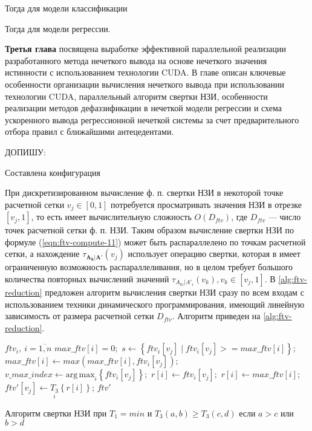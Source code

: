 Тогда для модели классификации

Тогда для модели регрессии.

\textbf{Третья глава} посвящена выработке эффективной параллельной реализации разработанного метода нечеткого вывода на основе нечеткого значения истинности с использованием технологии CUDA. В главе описан ключевые особенности организации вычисления нечеткого вывода при использовании технологии CUDA, параллельный алгоритм свертки НЗИ, особенности реализации методов дефаззификации в нечеткой модели регрессии и схема ускоренного вывода регрессионной нечеткой системы за счет предварительного отбора правил с ближайшими антецедентами.

{\color{red} ДОПИШУ:

Составлена конфигурация 

При дискретизированном вычисление ф. п. свертки НЗИ в некоторой точке расчетной сетки $v_j\in [0,1]$ потребуется просматривать значения НЗИ в отрезке $[v_j, 1]$, то есть имеет вычислительную сложность $O(D_{ftv})$, где $D_{ftv}$ --- число точек расчетной сетки ф. п. НЗИ. Таким образом вычисление свертки НЗИ по формуле (\ref{eqn:ftv-compute-11}) может быть распараллелено по точкам расчетной сетки, а нахождение $\tau_{\mathbf{A_k}|\mathbf{A'}}(v_j)$ использует операцию свертки, которая в имеет ограниченную возможность распараллеливания, но в целом требует большого количества повторных вычислений значений $\tau_{A_{ki}|A'_i}(v_k), v_k\in [v_j, 1]$. В \ref{alg:ftv-reduction} \cite{} предложен алгоритм вычисления свертки НЗИ сразу по всем входам с использованием техники динамического программирования, имеющий линейную зависимость от размера расчетной сетки $D_{ftv}$. Алгоритм приведен на \cref{alg:ftv-reduction}.
}

\begin{algorithm}
	\begin{algorithmic}
		\Require $ftv_i,\ i=\overline{1,n}$
		\State $max\_ftv[i] = 0;$
		\State $s \gets \left\{ftv_i[v_j] \mid ftv_i[v_j] >= max\_ftv[i]\right\};$
		\State $max\_ftv[i] \gets max(max\_ftv[i], ftv_i[v_j]);$
		\State $v\_max\_index \gets \mathrm{arg\,max}_i\left\{ftv_i[v_j]\right\};$
		\State $r[i] \gets ftv_{i}[v_j];$
		\Else
		\State $r[i] \gets max\_ftv[i];$
		\EndIf
		\State $ftv'[v_j] \gets \underset{i}{T_3}\left\{r[i]\right\}$;
		\EndFor
		\State \Return $ftv'$
	\end{algorithmic}
	\caption{Алгоритм свертки НЗИ при $T_1=min$ и $T_3(a, b) \ge T_3(c, d)$ если $a > c$ или $b > d$}
	\label{alg:ftv-reduction}
\end{algorithm}

